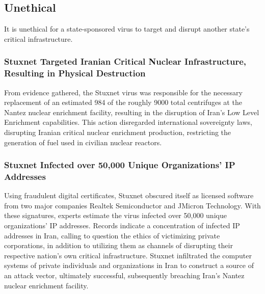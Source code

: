 \documentclass[12pt]{article}
\begin{document}
\begin{multicols}{2}
\subsection{Unethical}

It is unethical for a state-sponsored virus to target and disrupt another state's critical infrastructure.

\subsubsection{Stuxnet Targeted Iranian Critical Nuclear Infrastructure, Resulting in Physical Destruction}

From evidence gathered, the Stuxnet virus was responsible for the necessary replacement of an estimated 984 of the roughly 9000 total centrifuges at the Nantez nuclear enrichment facility, resulting in the disruption of Iran's Low Level Enrichment capabilities.\cite{lookIntoIranianNuclearProgram} This action disregarded international sovereignty laws, disrupting Iranian critical nuclear enrichment production, restricting the generation of fuel used in civilian nuclear reactors.\cite{internationalSovereigntyDefinition}\footnotemark[2] 


\subsubsection{Stuxnet Infected over 50,000 Unique Organizations' IP Addresses}

Using fraudulent digital certificates, Stuxnet obscured itself as licensed software from two major companies Realtek Semiconductor and JMicron Technology. With these signatures, experts estimate the virus infected over 50,000 unique organizations' IP addresses.\cite{lessonsFromStuxnet} Records indicate a concentration of infected IP addresses in Iran, calling to question the ethics of victimizing private corporations, in addition to  utilizing them as channels of disrupting their respective nation's own critical infrastructure. Stuxnet infiltrated the computer systems of private individuals and organizations in Iran to construct a source of an attack vector, ultimately successful, subsequently breaching Iran's Nantez nuclear enrichment facility.\cite{w32.stuxnetDossier} 


\end{multicols}
\end{document}
